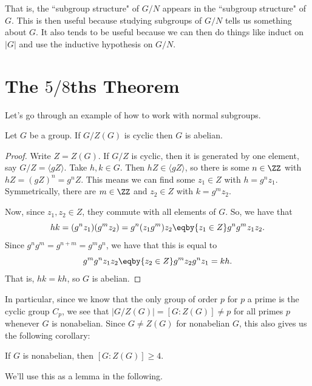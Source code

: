 \documentclass{article}
\begin{document}
That is, the ``subgroup structure" of $G/N$ appears in the ``subgroup structure" of $G$. This is then useful because studying subgroups of $G/N$ tells us something about $G$. It also tends to be useful because we can then do things like induct on $|G|$ and use the inductive hypothesis on $G/N$.

\section{The $5/8$ths Theorem}

Let's go through an example of how to work with normal subgroups.

\begin{prop*} Let $G$ be a group. If $G/Z(G)$ is cyclic then $G$ is abelian.\end{prop*}
\begin{proof} Write $Z=Z(G)$. If $G/Z$ is cyclic, then it is generated by one element, say $G/Z=\langle gZ\rangle$. Take $h,k\in G$. Then $hZ\in\langle gZ\rangle$, so there is some $n\in\ZZ$ with $hZ=(gZ)^n=g^nZ$. This means we can find some $z_1\in Z$ with $h=g^nz_1$. Symmetrically, there are $m\in\ZZ$ and $z_2\in Z$ with $k=g^mz_2$.

Now, since $z_1,z_2\in Z$, they commute with all elements of $G$. So, we have that
$$hk=(g^nz_1)(g^mz_2)=g^n(z_1g^m)z_2\eqby{z_1\in Z}g^ng^mz_1z_2.$$
Since $g^ng^m=g^{n+m}=g^mg^n$, we have that this is equal to
$$g^mg^nz_1z_2\eqby{z_2\in Z}g^mz_2g^nz_1=kh.$$
That is, $hk=kh$, so $G$ is abelian. \end{proof}

In particular, since we know that the only group of order $p$ for $p$ a prime is the cyclic group $C_p$, we see that $|G/Z(G)|=[G:Z(G)]\neq p$ for all primes $p$ whenever $G$ is nonabelian. Since $G\neq Z(G)$ for nonabelian $G$, this also gives us the following corollary:

\begin{cor*} If $G$ is nonabelian, then $[G:Z(G)]\geq 4$.\end{cor*}

We'll use this as a lemma in the following.
\end{document}
